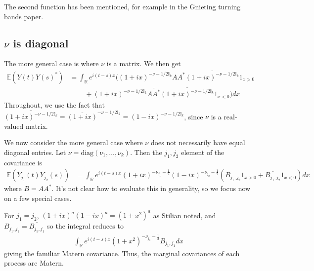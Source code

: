 \documentclass[11pt]{article}
\begin{document}
The second function has been mentioned, for example in the Gnieting turning bands paper.

\subsection{$\nu$ is diagonal}
The more general case is where $\nu$ is a matrix. We then get \begin{align*}
\mathbb{E}(Y(t)Y(s)^*) &= \int_\mathbb{R} e^{i(t-s) x}\big((1 + ix)^{-\nu - 1/2 \mathbb{I}_k}AA^*\overline{(1 + ix)^{-\nu - 1/2 \mathbb{I}_k} }1_{x > 0} \\
& \ \ \ \ \ \ \ \ \ \ +(1 + ix)^{-\nu - 1/2 \mathbb{I}_k}\overline{AA^*}\overline{(1 +ix)^{-\nu - 1/2 \mathbb{I}_k} }1_{x < 0} \big) dx
\end{align*}Throughout, we use the fact that $\overline{(1 + ix)^{- \nu - 1/2 \mathbb{I}_k}} = \overline{(1 + ix)}^{-\nu - 1/2\mathbb{I}_k} = (1 - ix)^{-\nu - 1/2\mathbb{I}_k}$, since $\nu$ is a real-valued matrix.

We now consider the more general case where $\nu$ does not necessarily have equal diagonal entries. Let $\nu = \textrm{diag}(\nu_1, \dots, \nu_k)$.
Then the $j_1, j_2$ element of the covariance is
\begin{align*}
\mathbb{E}(Y_{j_1}(t)Y_{j_2}(s)) &= \int_{\mathbb{R}} e^{i(t-s) x} (1 + i x)^{-\nu_{j_1}- \frac{1}{2}}(1 -i x)^{-\nu_{j_2}- \frac{1}{2}}(B_{j_1, j_2}1_{x > 0} + \overline{B_{j_1, j_2}} 1_{x < 0}) dx
\end{align*}where $B = AA^*$. It's not clear how to evaluate this in generality, so we focus now on a few special cases.

For $j_1 = j_2$, $(1 + ix)^{a} (1 - ix)^a = (1+x^2)^a$ as Stilian noted, and $B_{j_1, j_1} = \overline{B_{j_1, j_1}}$ so the integral reduces to \begin{align*}
\int_{\mathbb{R}} e^{i(t-s) x} (1 + x^2)^{-\nu_{j_1}- \frac{1}{2}}B_{j_1, j_1}dx
\end{align*}giving the familiar Matern covariance. Thus, the marginal covariances of each process are Matern.



\end{document}
